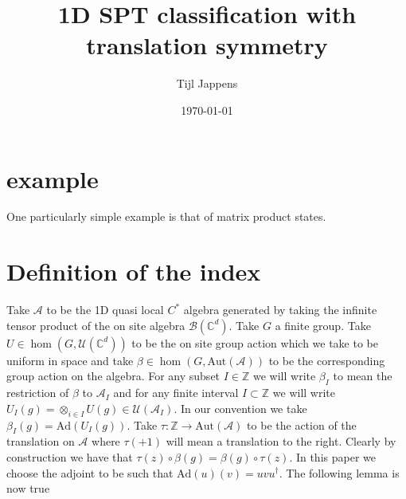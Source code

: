 \documentclass[12pt,a4paper,twoside]{article}
\title{1D SPT classification with translation symmetry}
\author{Tijl Jappens}
\date{\today}
\newcommand{\UU}{\mathcal U}
\newcommand{\BB}{\mathcal B}
\newcommand{\ZZ}{\mathbb Z}
\newcommand{\CC}{\mathbb C}
\renewcommand{\AA}{\mathcal A}
\newcommand{\Ad}{\textrm{Ad}}
\theoremstyle{definition}
\numberwithin{equation}{section}
\begin{document}
\section{example}
One particularly simple example is that of matrix product states.
\section{Definition of the index}
Take $\AA$ to be the 1D quasi local $C^*$ algebra generated by taking the infinite tensor product of the on site algebra $\BB(\CC^d)$. Take $G$ a finite group. Take $U\in\hom(G,\UU(\CC^d))$ to be the on site group action which we take to be uniform in space and take $\beta\in\hom(G,\text{Aut}(\AA))$ to be the corresponding group action on the algebra. For any subset $I\in\ZZ$ we will write $\beta_I$ to mean the restriction of $\beta$ to $\AA_I$ and for any finite interval $I\subset\ZZ$ we will write $U_I(g)=\otimes_{i\in I}U(g)\in\UU(\AA_I)$. In our convention we take $\beta_I(g)=\Ad(U_I(g))$. Take $\tau:\ZZ\rightarrow\text{Aut}(\AA)$ to be the action of the translation on $\AA$ where $\tau(+1)$ will mean a translation to the right. Clearly by construction we have that $\tau(z)\circ\beta(g)=\beta(g)\circ\tau(z)$. In this paper we choose the adjoint to be such that $\Ad(u)(v)=uvu^\dagger$. The following lemma is now true
\end{document}

